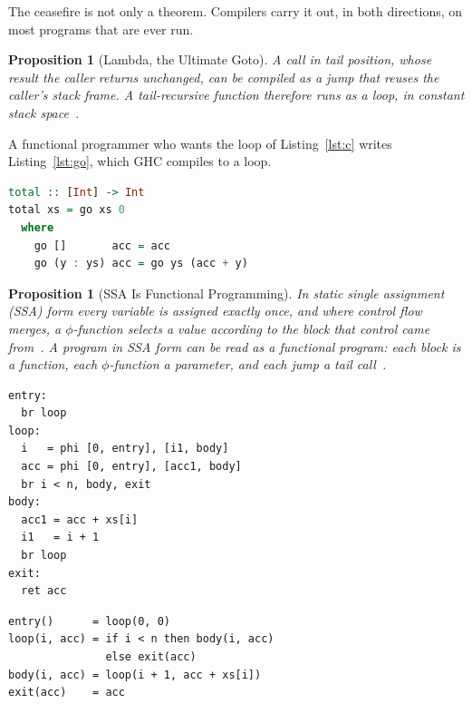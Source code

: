 \documentclass[11pt]{article}
\newtheorem{proposition}[theorem]{Proposition}
\theoremstyle{definition}
\theoremstyle{remark}
\begin{document}
The ceasefire is not only a theorem. Compilers carry it out, in both
directions, on most programs that are ever run.

\begin{proposition}[Lambda, the Ultimate Goto]\label{prop:goto}
  A call in tail position, whose result the caller returns unchanged, can
  be compiled as a jump that reuses the caller's stack frame. A
  tail-recursive function therefore runs as a loop, in constant stack
  space~\cite{steele77}.
\end{proposition}

A functional programmer who wants the loop of Listing~\ref{lst:c} writes
Listing~\ref{lst:go}, which GHC compiles to a loop.

\begin{lstlisting}[language=Haskell, caption={Listing~\ref{lst:c}, as a
  functional programmer writes it.}, label=lst:go]
total :: [Int] -> Int
total xs = go xs 0
  where
    go []       acc = acc
    go (y : ys) acc = go ys (acc + y)
\end{lstlisting}

\begin{proposition}[SSA Is Functional Programming]\label{prop:ssa}
  In \emph{static single assignment} (SSA) form every variable is
  assigned exactly once, and where control flow merges, a
  $\phi$-function selects a value according to the block that control
  came from~\cite{cytron}. A program in SSA form can be read as a
  functional program:
  each block is a function, each $\phi$-function a parameter, and each
  jump a tail call~\cite{appel,kelsey}.
\end{proposition}

\noindent
\begin{minipage}[t]{0.5\textwidth}
  \begin{lstlisting}[caption={Listing~\ref{lst:c} in SSA form.},
    label=lst:ssa]
entry:
  br loop
loop:
  i   = phi [0, entry], [i1, body]
  acc = phi [0, entry], [acc1, body]
  br i < n, body, exit
body:
  acc1 = acc + xs[i]
  i1   = i + 1
  br loop
exit:
  ret acc
  \end{lstlisting}
\end{minipage}%
\begin{minipage}[t]{0.5\textwidth}
  \begin{lstlisting}[caption={Listing~\ref{lst:ssa}, read as functions.},
    label=lst:fun]
entry()      = loop(0, 0)
loop(i, acc) = if i < n then body(i, acc)
               else exit(acc)
body(i, acc) = loop(i + 1, acc + xs[i])
exit(acc)    = acc
  \end{lstlisting}
\end{minipage}
\end{document}
